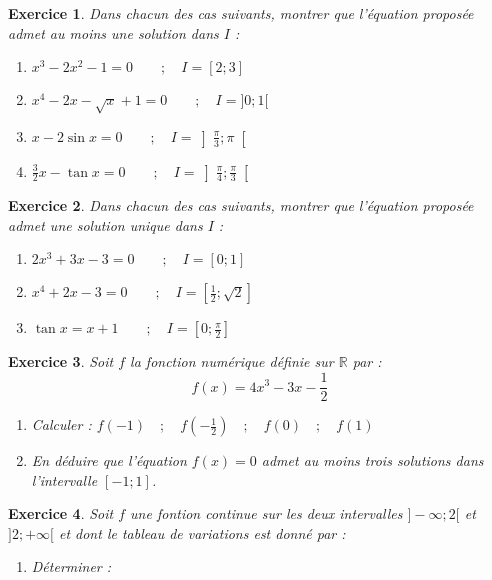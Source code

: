 \documentclass[12pt,a4paper]{article}
\theoremstyle{mystyle}
\newtheorem{exo}{Exercice}
\begin{document}
\begin{multicols*}{2}
\begin{exo}
    Dans chacun des cas suivants, montrer que l'équation proposée admet au moins une solution dans $I$ :
    \begin{enumerate}
        \item $x^3 - 2x^2 - 1 = 0\quad\quad;\quad I = [2;3]$
        \item $x^4 - 2x - \sqrt{x} + 1 = 0\quad\quad;\quad I = ]0;1[$
        \item $x - 2\sin{x} = 0\quad\quad;\quad I = \left]\displaystyle\frac{\pi}{3};\pi\right[$
        \item $\displaystyle\frac{3}{2}x - \tan{x} = 0\quad\quad;\quad I = \left]\displaystyle\frac{\pi}{4};\displaystyle\frac{\pi}{3}\right[$
    \end{enumerate}
\end{exo}

\begin{exo}
    Dans chacun des cas suivants, montrer que l'équation proposée admet une solution unique dans $I$ :
    \begin{enumerate}
        \item $2x^3 + 3x - 3 = 0 \quad\quad;\quad I = [0;1]$
        \item $x^4 + 2x - 3 = 0\quad\quad;\quad I = \left[\displaystyle\frac{1}{2};\sqrt{2}\right]$
        \item $\tan{x} = x + 1\quad\quad;\quad I = \left[0;\displaystyle\frac{\pi}{2}\right]$
    \end{enumerate}
\end{exo}

\begin{exo}
    Soit $f$ la fonction numérique définie sur $\mathbb{R}$ par :
    $$f(x) = 4x^3-3x-\frac{1}{2}$$
    \begin{enumerate}
        \item Calculer : $f(-1)\quad;\quad f\left(-\displaystyle\frac{1}{2}\right)\quad;\quad f(0)\quad;\quad f(1)$
        \item En déduire que l'équation $f(x) = 0$ admet au moins trois solutions dans l'intervalle $[-1;1]$.
    \end{enumerate}
\end{exo}
    
\begin{exo}
      Soit $f$ une fontion continue sur les deux intervalles $]-\infty; 2[$ et $]2;+\infty[$ et dont le tableau de variations est donné par :
      
        \hspace{-10mm}
        \begin{enumerate}
            \item Déterminer : 
            

\end{enumerate}
\end{exo}
\end{multicols*}
\end{document}
